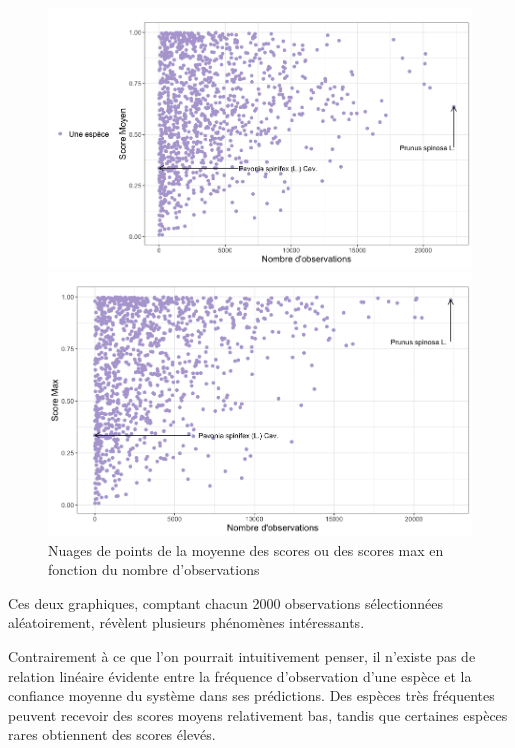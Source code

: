 \documentclass[a4paper,12pt]{article}
\begin{document}
\begin{figure}[H]
\centering
\begin{minipage}{0.5\textwidth}
  \includegraphics[width=0.9\linewidth]{images/mean_rd.png}
\end{minipage}%
\begin{minipage}{0.5\textwidth}
  \includegraphics[width=0.9\linewidth]{images/max_rd.png}
\end{minipage}
\caption{Nuages de points de la moyenne des scores ou des scores max en fonction du nombre d'observations}
\end{figure}

Ces deux graphiques, comptant chacun 2000 observations sélectionnées aléatoirement, révèlent plusieurs phénomènes intéressants.

\vspace{0.2cm}

Contrairement à ce que l'on pourrait intuitivement penser, il n'existe pas de relation linéaire évidente entre la fréquence d'observation d'une espèce et la confiance moyenne du système dans ses prédictions. Des espèces très fréquentes peuvent recevoir des scores moyens relativement bas, tandis que certaines espèces rares obtiennent des scores élevés.
\end{document}

